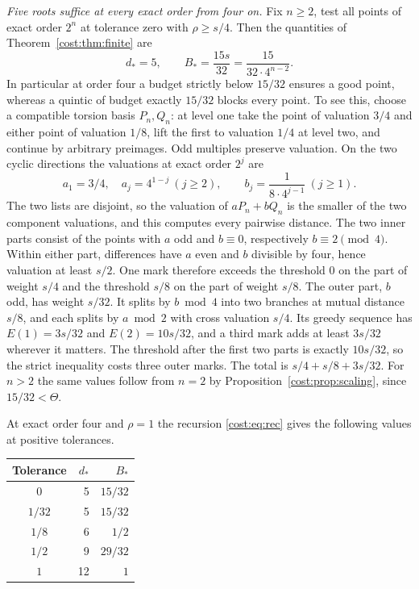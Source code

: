 \begin{example}
\emph{Five roots suffice at every exact order from four on.} Fix $n\ge2$, test all points of
exact order $2^n$ at tolerance zero with $\rho\ge s/4$. Then the quantities of
Theorem~\ref{cost:thm:finite} are
\[
 d_*=5,\qquad B_*=\frac{15s}{32}=\frac{15}{32\cdot4^{n-2}}.
\]
In particular at order four a budget strictly below $15/32$ ensures a good point, whereas a
quintic of budget exactly $15/32$ blocks every point. To see this, choose a compatible
torsion basis $P_n,Q_n$: at level one take the point of valuation $3/4$ and either point of
valuation $1/8$, lift the first to valuation $1/4$ at level two, and continue by arbitrary
preimages. Odd multiples preserve valuation. On the two cyclic directions the valuations at
exact order $2^j$ are
\[
 a_1=3/4,\quad a_j=4^{1-j}\ (j\ge2),\qquad b_j=\frac1{8\cdot4^{j-1}}\ (j\ge1).
\]
The two lists are disjoint, so the valuation of $aP_n+bQ_n$ is the smaller of the two
component valuations, and this computes every pairwise distance. The two inner parts
consist of the points with $a$ odd and $b\equiv0$, respectively $b\equiv2\pmod4$. Within
either part, differences have $a$ even and $b$ divisible by four, hence valuation at least
$s/2$. One mark therefore exceeds the threshold $0$ on the part of weight $s/4$ and the
threshold $s/8$ on the part of weight $s/8$. The outer part, $b$ odd, has weight $s/32$. It
splits by $b\bmod4$ into two branches at mutual distance $s/8$, and each splits by
$a\bmod2$ with cross valuation $s/4$. Its greedy sequence has $E(1)=3s/32$ and
$E(2)=10s/32$, and a third mark adds at least $3s/32$ wherever it matters. The threshold
after the first two parts is exactly $10s/32$, so the strict inequality costs three outer
marks. The total is $s/4+s/8+3s/32$. For $n>2$ the same values follow from $n=2$ by
Proposition~\ref{cost:prop:scaling}, since $15/32<\Theta$.

At exact order four and $\rho=1$ the recursion \eqref{cost:eq:rec} gives the following
values at positive tolerances.
\begin{center}
\begin{tabular}{@{}crr@{}}\toprule
Tolerance & $d_*$ & $B_*$\\
\midrule
$0$ &5&$15/32$\\
$1/32$ &5&$15/32$\\
$1/8$ &6&$1/2$\\
$1/2$ &9&$29/32$\\
$1$ &12&$1$\\
\bottomrule\end{tabular}
\end{center}


\end{example}
